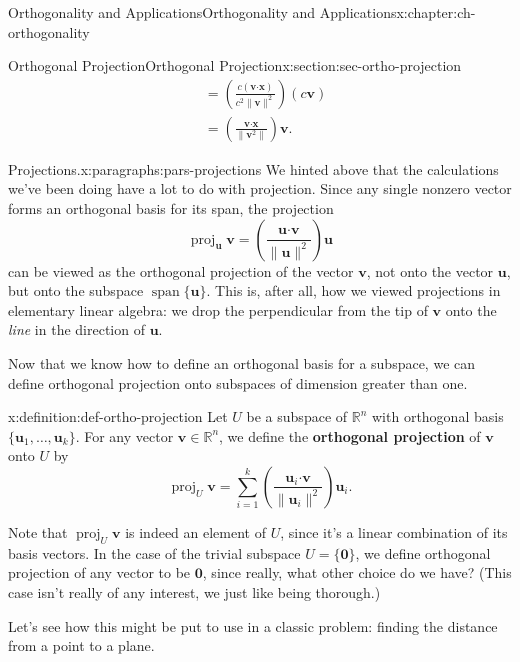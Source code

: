 \documentclass[oneside,10pt,]{book}
\newcommand{\terminology}[1]{\textbf{#1}}
\numberwithin{equation}{section}
\newcommand{\spn}{\operatorname{span}}
\newcommand{\R}{\mathbb{R}}
\newcommand{\dotp}{\!\boldsymbol{\cdot}\!}
\newcommand{\len}[1]{\lVert #1\rVert}
\newcommand{\proj}[2]{\operatorname{proj}_{#1}{#2}}
\newcommand{\uu}{\mathbf{u}}
\newcommand{\vv}{\mathbf{v}}
\newcommand{\xx}{\mathbf{x}}
\newcommand{\amp}{&}
\begin{document}
\begin{chapterptx}{Orthogonality and Applications}{}{Orthogonality and Applications}{}{}{x:chapter:ch-orthogonality}
\begin{sectionptx}{Orthogonal Projection}{}{Orthogonal Projection}{}{}{x:section:sec-ortho-projection}
{\begin{align*}
\amp= \left(\frac{c(\vv\dotp\xx)}{c^2\len{\vv}^2}\right)(c\vv)\\
\amp=\left(\frac{\vv\dotp\xx}{\len{\vv^2}}\right)\vv\text{.}
\end{align*}
%
}%
\par
\begin{paragraphs}{Projections.}{x:paragraphs:pars-projections}%
We hinted above that the calculations we've been doing have a lot to do with projection. Since any single nonzero vector forms an orthogonal basis for its span, the projection%
\begin{equation*}
\proj{\uu}{\vv}=\left(\frac{\uu\dotp\vv}{\len{\uu}^2}\right)\uu
\end{equation*}
can be viewed as the orthogonal projection of the vector \(\vv\), not onto the vector \(\uu\), but onto the subspace \(\spn\{\uu\}\). This is, after all, how we viewed projections in elementary linear algebra: we drop the perpendicular from the tip of \(\vv\) onto the \emph{line} in the direction of \(\uu\).%
\par
Now that we know how to define an orthogonal basis for a subspace, we can define orthogonal projection onto subspaces of dimension greater than one.%
\begin{definition}{}{x:definition:def-ortho-projection}%
Let \(U\) be a subspace of \(\R^n\) with orthogonal basis \(\{\uu_1,\ldots, \uu_k\}\). For any vector \(\vv\in \R^n\), we define the \terminology{orthogonal projection} of \(\vv\) onto \(U\) by%
\begin{equation*}
\proj{U}{\vv} = \sum_{i=1}^k\left(\frac{\uu_i\dotp\vv}{\len{\uu_i}^2}\right)\uu_i\text{.}
\end{equation*}
%
\end{definition}
Note that \(\proj{U}{\vv}\) is indeed an element of \(U\), since it's a linear combination of its basis vectors. In the case of the trivial subspace \(U=\{\mathbf{0}\}\), we define orthogonal projection of any vector to be \(\mathbf{0}\), since really, what other choice do we have? (This case isn't really of any interest, we just like being thorough.)%
\par
Let's see how this might be put to use in a classic problem: finding the distance from a point to a plane.%
\end{paragraphs}
\end{sectionptx}
\end{chapterptx}
\end{document}
